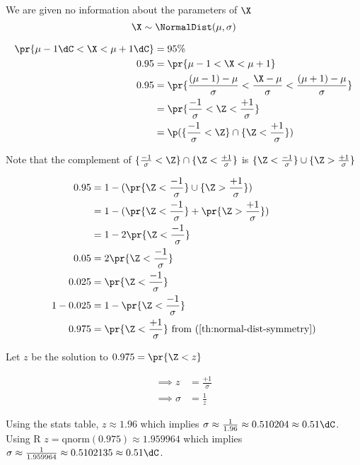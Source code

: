 We are given no information about the parameters of $\X$
\[
\X \sim \NormalDist (\mu, \sigma)
\]

\begin{align*}
\pr{\mu - 1\dC < \X < \mu + 1\dC} &= 95\% \\
0.95 &= \pr{\mu - 1 < \X < \mu + 1} \\
0.95 &= \pr{\frac{(\mu - 1) - \mu}{\sigma} < \frac{\X - \mu}{\sigma} < \frac{(\mu + 1) - \mu}{\sigma}} \\
&= \pr{\frac{-1}{\sigma} < \Z < \frac{+1}{\sigma}} \\
&= \p(\{ \frac{-1}{\sigma} < \Z \} \cap \{\Z < \frac{+1}{\sigma} \}) \\
\end{align*}

Note that the complement of $\{ \frac{-1}{\sigma} < \Z \} \cap \{\Z < \frac{+1}{\sigma} \}$ is
$\{ \Z < \frac{-1}{\sigma} \} \cup \{ \Z > \frac{+1}{\sigma} \}$

\begin{align*}
0.95 &= 1 - (\pr{\Z < \frac{-1}{\sigma} \} \cup \{ \Z > \frac{+1}{\sigma}}) \\
&= 1 - (\pr{\Z < \frac{-1}{\sigma}} + \pr{\Z > \frac{+1}{\sigma}}) \\
&= 1 - 2\pr{\Z < \frac{-1}{\sigma}} \\
0.05 &= 2\pr{\Z < \frac{-1}{\sigma}} \\
0.025 &= \pr{\Z < \frac{-1}{\sigma}} \\
1 - 0.025 &= 1- \pr{\Z < \frac{-1}{\sigma}} \\
0.975 &= \pr{\Z < \frac{+1}{\sigma}}
\text{	from (\ref{th:normal-dist-symmetry})}
\\
\end{align*}

Let $z$ be the solution to $0.975 = \pr{\Z < z}$

\begin{align*}
\implies z &= \frac{+1}{\sigma} \\
\implies \sigma &= \frac{1}{z}
\end{align*}

Using the stats table, $z \approx 1.96$ which implies $\sigma \approx \frac{1}{1.96} \approx 0.510204 \approx 0.51\dC$.
Using R $z = \text{qnorm}(0.975) \approx 1.959964$ which implies $\sigma \approx \frac{1}{1.959964} \approx 0.5102135 \approx 0.51\dC$.
